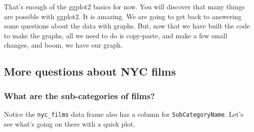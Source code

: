 \documentclass[]{book}
\newenvironment{Shaded}{\begin{snugshade}}{\end{snugshade}}
\newcommand{\KeywordTok}[1]{\textcolor[rgb]{0.13,0.29,0.53}{\textbf{#1}}}
\newcommand{\DataTypeTok}[1]{\textcolor[rgb]{0.13,0.29,0.53}{#1}}
\newcommand{\DecValTok}[1]{\textcolor[rgb]{0.00,0.00,0.81}{#1}}
\newcommand{\StringTok}[1]{\textcolor[rgb]{0.31,0.60,0.02}{#1}}
\newcommand{\CommentTok}[1]{\textcolor[rgb]{0.56,0.35,0.01}{\textit{#1}}}
\newcommand{\OperatorTok}[1]{\textcolor[rgb]{0.81,0.36,0.00}{\textbf{#1}}}
\newcommand{\NormalTok}[1]{#1}
\begin{document}
That's enough of the ggplot2 basics for now. You will discover that many
things are possible with ggplot2. It is amazing. We are going to get
back to answering some questions about the data with graphs. But, now
that we have built the code to make the graphs, all we need to do is
copy-paste, and make a few small changes, and boom, we have our graph.

\subsection{More questions about NYC
films}\label{more-questions-about-nyc-films}

\subsubsection{What are the sub-categories of
films?}\label{what-are-the-sub-categories-of-films}

Notice the \texttt{nyc\_films} data frame also has a column for
\texttt{SubCategoryName}. Let's see what's going on there with a quick
plot.

\begin{Shaded}
\end{Shaded}
\end{document}
